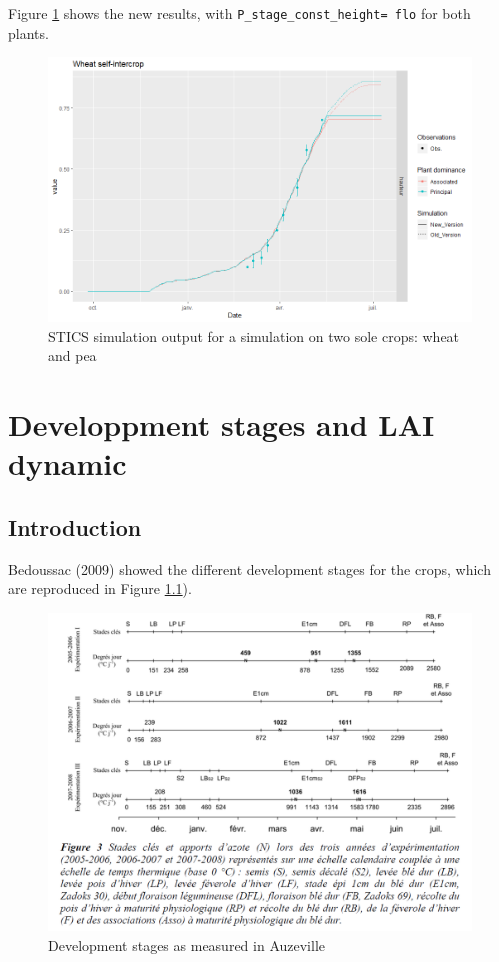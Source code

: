 \documentclass[
]{book}
\begin{document}
Figure \ref{fig:constheight} shows the new results, with \texttt{P\_stage\_const\_height=\ flo} for both plants.

\begin{figure}
\centering
\includegraphics{img/const_height.png}
\caption{\label{fig:constheight}STICS simulation output for a simulation on two sole crops: wheat and pea}
\end{figure}

\hypertarget{stages}{%
\chapter{Developpment stages and LAI dynamic}\label{stages}}

\hypertarget{introduction-8}{%
\section{Introduction}\label{introduction-8}}

Bedoussac (2009) showed the different development stages for the crops, which are reproduced in Figure \ref{fig:stademeas}).

\begin{figure}
\centering
\includegraphics{img/Stades.png}
\caption{\label{fig:stademeas}Development stages as measured in Auzeville}
\end{figure}
\end{document}
